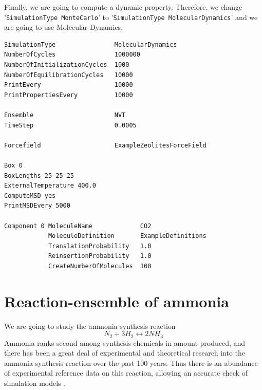 Finally, we are going to compute a dynamic property. Therefore, we change '\verb+SimulationType MonteCarlo+' to
'\verb+SimulationType MolecularDynamics+' and we are going to use Molecular Dynamics.

\begin{verbatim}
SimulationType                MolecularDynamics
NumberOfCycles                1000000
NumberOfInitializationCycles  1000
NumberOfEquilibrationCycles   10000
PrintEvery                    10000
PrintPropertiesEvery          10000

Ensemble                      NVT
TimeStep                      0.0005

Forcefield                    ExampleZeolitesForceField

Box 0
BoxLengths 25 25 25
ExternalTemperature 400.0
ComputeMSD yes
PrintMSDEvery 5000

Component 0 MoleculeName             CO2
            MoleculeDefinition       ExampleDefinitions
            TranslationProbability   1.0
            ReinsertionProbability   1.0
            CreateNumberOfMolecules  100

\end{verbatim}

\begin{center}
\end{center}

\section{Reaction-ensemble of ammonia}

We are going to study the ammonia synthesis reaction
\begin{equation}
  N_2 + 3H_2 \leftrightarrow 2NH_3
\end{equation}
Ammonia ranks second among synthesis chemicals in amount produced, and there has been a great deal of experimental and 
theoretical research into the ammonia synthesis reaction over the past 100 years. Thus there is an abundance
of experimental reference data on this reaction, allowing an accurate check of simulation models \cite{Turner2001}.

